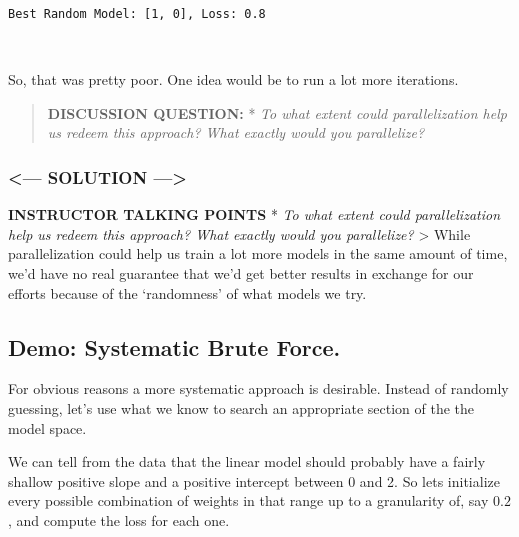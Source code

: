 \documentclass[11pt]{article}
\begin{document}
    \begin{Verbatim}[commandchars=\\\{\}]
Best Random Model: [1, 0], Loss: 0.8

    \end{Verbatim}

    \begin{center}
    \end{center}
    { \hspace*{\fill} \\}
    
    So, that was pretty poor. One idea would be to run a lot more
iterations.

\begin{quote}
\textbf{DISCUSSION QUESTION:} * \emph{To what extent could
parallelization help us redeem this approach? What exactly would you
parallelize?}
\end{quote}

    \hypertarget{solution}{%
\subsubsection{\textless{}--- SOLUTION
---\textgreater{}}\label{solution}}

\textbf{INSTRUCTOR TALKING POINTS} * \emph{To what extent could
parallelization help us redeem this approach? What exactly would you
parallelize?} \textgreater{} While parallelization could help us train a
lot more models in the same amount of time, we'd have no real guarantee
that we'd get better results in exchange for our efforts because of the
`randomness' of what models we try.

    \hypertarget{demo-systematic-brute-force.}{%
\subsection{Demo: Systematic Brute
Force.}\label{demo-systematic-brute-force.}}

    For obvious reasons a more systematic approach is desirable. Instead of
randomly guessing, let's use what we know to search an appropriate
section of the the model space.

We can tell from the data that the linear model should probably have a
fairly shallow positive slope and a positive intercept between 0 and 2.
So lets initialize every possible combination of weights in that range
up to a granularity of, say \(0.2\), and compute the loss for each one.
\end{document}
